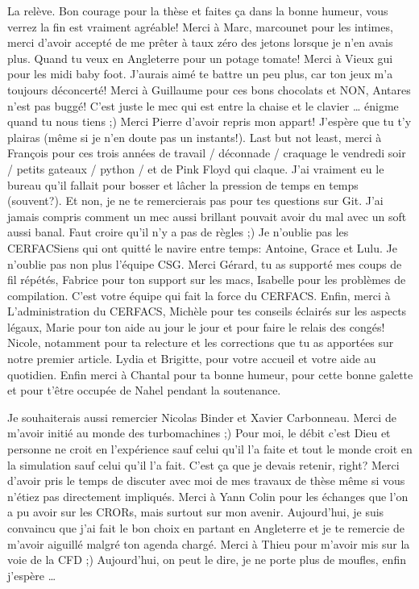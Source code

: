 La relève. Bon courage pour la thèse et faites ça dans la bonne humeur, vous
verrez la fin est vraiment agréable!
Merci à Marc, marcounet pour les intimes, merci d'avoir accepté de me prêter à taux
zéro des
jetons lorsque je n'en avais plus. Quand tu veux en Angleterre pour un
potage tomate! Merci à Vieux gui pour les midi baby foot. J'aurais aimé
te battre un peu plus, car ton jeux m'a toujours déconcerté! 
Merci à Guillaume pour ces bons chocolats et NON, Antares n'est pas buggé!
C'est juste le mec qui est entre la chaise et le clavier \ldots{} 
énigme quand tu nous tiens ;) 
Merci Pierre d'avoir repris mon appart! J'espère que tu t'y plairas
(même si je n'en doute pas un instants!).
Last but not least, merci à François pour ces
trois années de travail / déconnade / craquage le vendredi soir / 
petits gateaux / python / et de Pink Floyd qui claque. J'ai vraiment
eu le bureau qu'il fallait pour bosser et lâcher la pression de temps
en temps (souvent?). Et non, je ne te remercierais pas
pour tes questions sur Git. J'ai jamais compris comment 
un mec aussi brillant pouvait avoir du mal
avec un soft aussi banal. Faut croire qu'il n'y a pas de règles ;)
Je n'oublie pas les CERFACSiens qui ont quitté le navire entre temps:
Antoine, Grace et Lulu.
Je n'oublie pas non plus l'équipe CSG. Merci Gérard,
tu as supporté mes coups de fil répétés, Fabrice pour ton
support sur les macs, Isabelle pour les problèmes de
compilation. C'est votre équipe qui fait la force du CERFACS.
Enfin, merci à L'administration du CERFACS, Michèle pour tes
conseils éclairés sur les aspects légaux, Marie pour
ton aide au jour le jour et pour faire le relais des 
congés! Nicole, notamment pour ta relecture et les
corrections que tu as apportées sur notre premier
article. Lydia et Brigitte, pour votre accueil
et votre aide au quotidien.
Enfin merci à Chantal pour ta bonne humeur, pour 
cette bonne galette et pour t'être occupée de
Nahel pendant la soutenance.

Je souhaiterais aussi remercier Nicolas Binder et
Xavier Carbonneau. 
Merci de m'avoir initié au monde des turbomachines ;) Pour moi,
le débit c'est Dieu et personne ne croit en l'expérience
sauf celui qu'il l'a faite et tout le monde croit en la
simulation sauf celui qu'il l'a fait. 
C'est ça que je devais retenir, right?
Merci d'avoir pris le temps de 
discuter avec moi de mes travaux de thèse même si
vous n'étiez pas directement impliqués.
Merci à Yann Colin pour les échanges que l'on a pu avoir
sur les CRORs, mais surtout sur mon avenir. Aujourd'hui,
je suis convaincu que j'ai fait le bon choix en partant
en Angleterre et je te remercie
de m'avoir aiguillé malgré ton agenda chargé.
Merci à Thieu pour m'avoir mis sur la voie de la CFD ;)
Aujourd'hui, on peut le dire, je ne porte plus de moufles, enfin
j'espère \ldots{}

